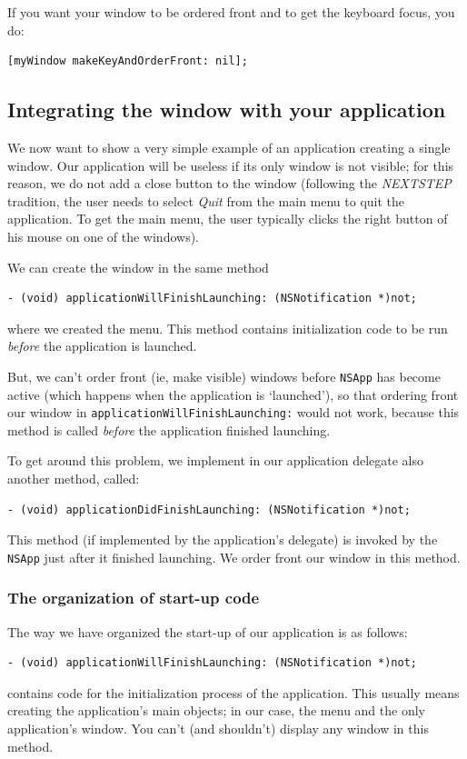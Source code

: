 \documentclass[a4paper]{article}
\begin{document}
If you want your window to be ordered front and to get the keyboard
focus, you do:
\begin{verbatim}
[myWindow makeKeyAndOrderFront: nil];
\end{verbatim}

\subsection{Integrating the window with your application}
We now want to show a very simple example of an application creating a
single window.  Our application will be useless if its only window is
not visible; for this reason, we do not add a close button to the
window (following the \emph{NEXTSTEP} tradition, the user needs to
select \emph{Quit} from the main menu to quit the application.  To get
the main menu, the user typically clicks the right button of his mouse
on one of the windows).

We can create the window in the same method 
\begin{verbatim}
- (void) applicationWillFinishLaunching: (NSNotification *)not;
\end{verbatim}
where we created the menu.  This method contains initialization 
code to be run \emph{before} the application is launched.

But, we can't order front (ie, make visible) windows before
\texttt{NSApp} has become active (which happens when the application
is `launched'), so that ordering front our window in
\texttt{applicationWillFinishLaunching:} would not work, because this
method is called \emph{before} the application finished launching.

To get around this problem, we implement in our application delegate
also another method, called:
\begin{verbatim}
- (void) applicationDidFinishLaunching: (NSNotification *)not;
\end{verbatim}
This method (if implemented by the application's delegate) is invoked
by the \texttt{NSApp} just after it finished launching.  We order
front our window in this method.

\subsubsection{The organization of start-up code}
The way we have organized the start-up of our application is as
follows:
\begin{verbatim}
- (void) applicationWillFinishLaunching: (NSNotification *)not;
\end{verbatim}
contains code for the initialization process of the application.  This
usually means creating the application's main objects; in our case,
the menu and the only application's window.  You can't (and shouldn't)
display any window in this method.
\end{document}
